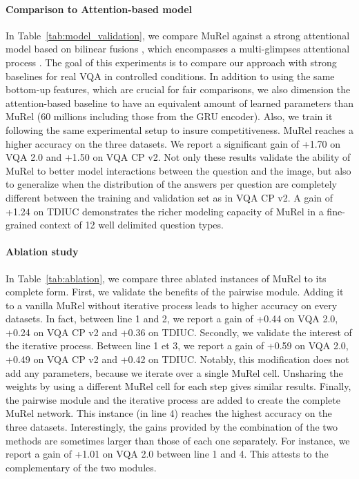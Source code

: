 \documentclass[10pt,twocolumn,letterpaper]{article}
\begin{document}
\paragraph{Comparison to Attention-based model}
In Table~\ref{tab:model_validation}, we compare MuRel against a strong attentional model based on bilinear fusions \cite{benyounescadene2017mutan}, which encompasses a  multi-glimpses attentional process \cite{FukuiPYRDR16}. The goal of this experiments is to compare our approach with strong baselines for real VQA in controlled conditions. In addition to using the same bottom-up features, which are crucial for fair comparisons, we also dimension the attention-based baseline to have an equivalent amount of learned parameters than MuRel (60 millions including those from the GRU encoder). Also, we train it following the same experimental setup to insure competitiveness.
MuRel reaches a higher accuracy on the three datasets. We report a significant gain of +1.70 on VQA 2.0 and +1.50 on VQA CP v2. 
Not only these results validate the ability of MuRel to better model interactions between the question and the image, but also to generalize when the distribution of the answers per question are completely different between the training and validation set as in VQA CP v2.
A gain of +1.24 on TDIUC demonstrates the richer modeling capacity of MuRel in a fine-grained context of 12 well delimited question types. 

\paragraph{Ablation study} In Table~\ref{tab:ablation}, we compare three ablated instances of MuRel to its complete form.
First, we validate the benefits of the pairwise module. Adding it to a vanilla MuRel without iterative process leads to higher accuracy on every datasets. In fact, between line 1 and 2, we report a gain of +0.44 on VQA 2.0, +0.24 on VQA CP v2 and +0.36 on TDIUC.
Secondly, we validate the interest of the iterative process. Between line 1 et 3, we report a gain of +0.59 on VQA 2.0, +0.49 on VQA CP v2 and +0.42 on TDIUC.
Notably, this modification does not add any parameters, because we iterate over a single MuRel cell. 
Unsharing the weights by using a different MuRel cell for each step gives similar results.
Finally, the pairwise module and the iterative process are added to create the complete MuRel network. This instance (in line 4) reaches the highest accuracy on the three datasets. Interestingly, the gains provided by the combination of the two methods are sometimes larger than those of each one separately. For instance, we report a gain of +1.01 on VQA 2.0 between line 1 and 4. This attests to the complementary of the two modules.
\end{document}
